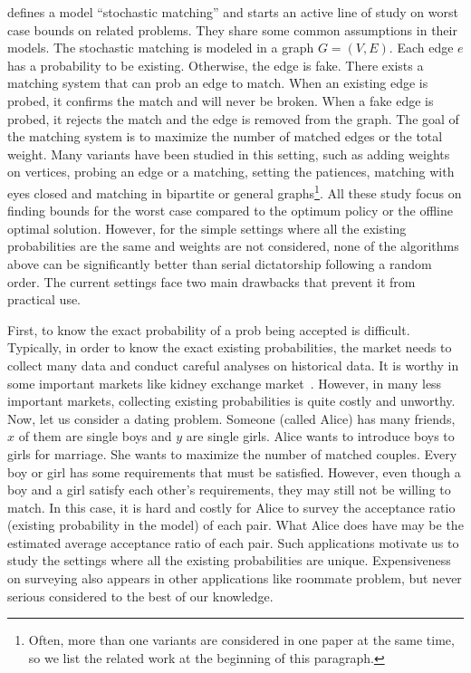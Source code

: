 \documentclass[letterpaper]{article}
\begin{document}
\cite{chen2009approximating} defines a model ``stochastic matching'' and starts an active line of study on worst case bounds on related problems\cite{adamczyk2011improved,costello2012stochastic,poloczek2012randomized,goel2012matching,bansal2012lp}.
They share some common assumptions in their models.
The stochastic matching is modeled in a graph $G=(V,E)$.
Each edge $e$ has a probability to be existing.
Otherwise, the edge is fake.
There exists a matching system that can prob an edge to match.
When an existing edge is probed, it confirms the match and will never be broken.
When a fake edge is probed, it rejects the match and the edge is removed from the graph.
The goal of the matching system is to maximize the number of matched edges or the total weight. 
Many variants have been studied in this setting, such as adding weights on vertices, probing an edge or a matching, setting the patiences, matching with eyes closed and matching in bipartite or general graphs\footnote{Often, more than one variants are considered in one paper at the same time, so we list the related work at the beginning of this paragraph.}.
All these study focus on finding bounds for the worst case compared to the optimum policy or the offline optimal solution.
However, for the simple settings where all the existing probabilities are the same and weights are not considered, none of the algorithms above can be significantly better than serial dictatorship following a random order.
The current settings face two main drawbacks that prevent it from practical use.

First, to know the exact probability of a prob being accepted is difficult.
Typically, in order to know the exact  existing probabilities, the market needs to collect many data and conduct careful analyses on historical data.
It is worthy in some important markets like kidney exchange market~\cite{dickerson2013failure,dickerson2015futurematch}.
However, in many less important markets, collecting existing probabilities is quite costly and unworthy.
Now, let us consider a dating problem.
Someone (called Alice) has many friends, $x$ of them are single boys and $y$ are single girls.
Alice wants to introduce boys to girls for marriage.
She wants to maximize the number of matched couples.
Every boy or girl has some requirements that must be satisfied.
However, even though a boy and a girl satisfy each other's requirements, they may still not be willing to match.
In this case, it is hard and costly for Alice to survey the acceptance ratio (existing probability in the model) of each pair.
What Alice does have may be the estimated average acceptance ratio of each pair.
Such applications motivate us to study the settings where all the existing probabilities are unique.
Expensiveness on surveying also appears in other applications like roommate problem, but never serious considered to the best of our knowledge.
\end{document}
